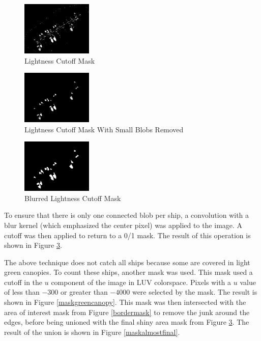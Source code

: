 \documentclass[12pt]{article}
\begin{document}
\begin{figure}
\centering
\includegraphics[width=0.30\textwidth]{mask_shiny.png}
\caption{Lightness Cutoff Mask}
\label{maskshiny}
\end{figure}

\begin{figure}
\centering
\includegraphics[width=0.30\textwidth]{mask_shiny_minus_blobs.png}
\caption{Lightness Cutoff Mask With Small Blobs Removed}
\label{maskshinyminusblobs}
\end{figure}

\begin{figure}
\centering
\includegraphics[width=0.30\textwidth]{mask_shiny_minus_blobs_blurred.png}
\caption{Blurred Lightness Cutoff Mask}
\label{maskshinyminusblobsblurred}
\end{figure}

To ensure that there is only one connected blob per ship, a convolution with a blur kernel (which emphasized the center pixel) was applied to the image. A cutoff was then applied to return to a 0/1 mask. The result of this operation is shown in Figure \ref{maskshinyminusblobsblurred}.

The above technique does not catch all ships because some are covered in light green canopies. To count these ships, another mask was used. This mask used a cutoff in the \(u\) component of the image in LUV colorspace. Pixels with a \(u\) value of less than \(-300\) or greater than \(-4000\) were selected by the mask. The result is shown in Figure \ref{maskgreencanopy}. This mask was then intersected with the area of interest mask from Figure \ref{bordermask} to remove the junk around the edges, before being unioned with the final shiny area mask from Figure \ref{maskshinyminusblobsblurred}. The result of the union is shown in Figure \ref{maskalmostfinal}.
\end{document}
